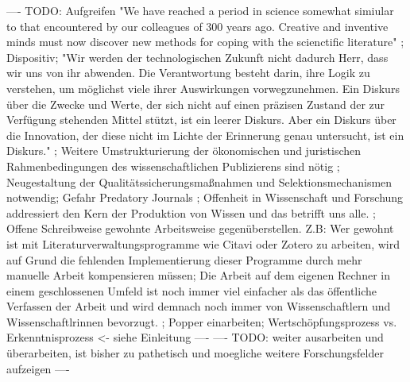 ---- TODO: Aufgreifen "We have reached a period in science somewhat simiular to that encountered by our colleagues of 300 years ago. Creative and inventive minds must now discover new methods for coping with the scienctific literature" \cite{porter_1964_scientific}; Dispositiv; "Wir werden der technologischen Zukunft nicht dadurch Herr, dass wir uns von ihr abwenden. Die Verantwortung besteht darin, ihre Logik zu verstehen, um möglichst viele ihrer Auswirkungen vorwegzunehmen. Ein Diskurs über die Zwecke und Werte, der sich nicht auf einen präzisen Zustand der zur Verfügung stehenden Mittel stützt, ist ein leerer Diskurs. Aber ein Diskurs über die Innovation, der diese nicht im Lichte der Erinnerung genau untersucht, ist ein Diskurs." \cite{naeder_2010_open}; Weitere Umstrukturierung der ökonomischen und juristischen Rahmenbedingungen des wissenschaftlichen Publizierens sind nötig \cite{naeder_2010_open};  Neugestaltung der Qualitätssicherungsmaßnahmen und Selektionsmechanismen notwendig; Gefahr Predatory Journals \cite{Beall_2012}; Offenheit in Wissenschaft und Forschung addressiert den Kern der Produktion von Wissen und das betrifft uns alle. \cite{Mussell_2013}; Offene Schreibweise gewohnte Arbeitsweise gegenüberstellen. Z.B: Wer gewohnt ist mit Literaturverwaltungsprogramme wie Citavi oder Zotero zu arbeiten, wird auf Grund die fehlenden Implementierung dieser Programme  durch mehr manuelle Arbeit kompensieren müssen; Die Arbeit auf dem eigenen Rechner in einem geschlossenen Umfeld ist noch immer viel einfacher als das öffentliche Verfassen der Arbeit und wird demnach noch immer von Wissenschaftlern und Wissenschaftlrinnen bevorzugt. ; Popper einarbeiten; Wertschöpfungsprozess vs. Erkenntnisprozess <- siehe Einleitung ----
---- TODO: weiter ausarbeiten und überarbeiten, ist bisher zu pathetisch und moegliche weitere Forschungsfelder aufzeigen ----
